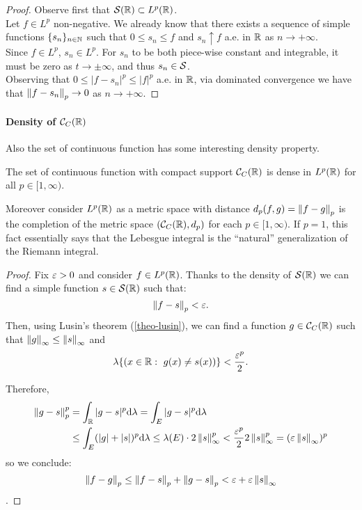 \begin{proof}
	Observe first that $\mathcal S(\mathbb R) \subset L^p(\mathbb R)$.\\
	Let $f\in L^p$ non-negative. We already know that there exists a sequence of simple functions $\{s_n\}_{n\in\mathbb N}$ such that $0\leq s_n \leq f$ and $s_n \uparrow f$ a.e. in $\mathbb R$ as $n \to +\infty$.\\	
	Since $f\in L^p$, $s_n \in L^p$. For $s_n$ to be both piece-wise constant and integrable, it must be zero as $t \to \pm\infty$, and thus $s_n \in \mathcal S$. \\
	Observing that $0\leq|f - s_n|^p \leq |f|^p$ a.e. in $\mathbb R$, via dominated convergence we have that $\left\lVert f - s_n\right\rVert_p \to 0$ as $n \to +\infty$.
\end{proof}

\paragraph{Density of $\mathcal C_C(\mathbb R)$} Also the set of continuous function has some interesting density property.
\begin{theo}
	The set of continuous function with compact support $\mathcal C_C (\mathbb R)$ is dense in $L^p(\mathbb R)$ for all $p \in [1,\infty)$.
\end{theo}

Moreover consider $L^p(\mathbb R)$ as a metric space with distance $d_p(f,g) = \left\lVert f-g\right\rVert_p$ is the completion of the metric space $(\mathcal C_C(\mathbb R), d_p)$ for each $p \in [1, \infty)$. If $p=1$, this fact essentially says that the Lebesgue integral is the ``natural'' generalization of the Riemann integral.

\begin{proof}
	Fix $\varepsilon>0$ and consider $f \in L^p(\mathbb R)$.
	Thanks to the density of $\mathcal S(\mathbb R)$ we can find a simple function $s\in \mathcal S(\mathbb R)$ such that:
	$$ \left\lVert f-s\right\rVert_p < \varepsilon.$$
	Then, using Lusin's theorem (\vref{theo-lusin}), we can find  a function $g\in \mathcal C_C(\mathbb R)$ such that  $\left\lVert g\right\rVert_\infty \leq \left\lVert s\right\rVert_\infty$ and
	$$\lambda\{(x \in \mathbb R: \ g(x) \neq s(x))\} < \frac{\varepsilon^p}{2}.$$
	
	Therefore,
	\begin{align*}
	\left\lVert g-s\right\rVert_p^p & =\int_{\mathbb R}| g-s|^p \mathrm d\lambda =\int_{E}| g-s|^p \mathrm d\lambda \\
				   & \leq \int_{E}(|g|+|s|)^p \mathrm d\lambda \leq \lambda (E) \cdot 2\left\lVert s\right\rVert_{\infty}^p < \frac{\varepsilon^p}{2} 2\left\lVert s\right\rVert_{\infty}^p =( \varepsilon \left\lVert s\right\rVert_{\infty})^p
	\end{align*}
	so we conclude:
	$$\left\lVert f-g\right\rVert_p \leq \left\lVert f-s\right\rVert_p + \left\lVert g-s\right\rVert_p < \varepsilon + \varepsilon \left\lVert s\right\rVert_\infty$$.
\end{proof}


